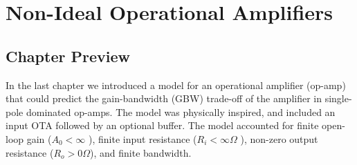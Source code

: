 \chapter{Non-Ideal Operational Amplifiers}
\label{ch:ch18_opamp_real}
\graphicspath{{./figures/figs_ch18_opamp_real/}}
\section{Chapter Preview}
In the last chapter we introduced a model for an operational amplifier (op-amp) that could predict the gain-bandwidth (GBW) trade-off of the amplifier in single-pole dominated op-amps.  The model was physically inspired, and included an input OTA followed by an optional buffer.  The model accounted for finite open-loop gain ($A_0 < \infty$ ), finite input resistance ($R_i < \infty\Omega$ ), non-zero output resistance ($R_o > 0\Omega$), and finite bandwidth.


